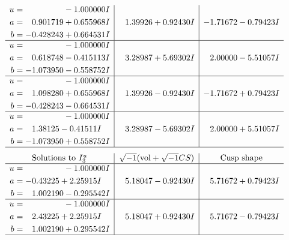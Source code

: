 \documentclass[1p]{elsarticle_modified}
\theoremstyle{definition}
\newcommand{\I}{\sqrt{-1}}
\begin{document}
$$\begin{array}{c|c|c}
\begin{aligned}
u &= \phantom{-0.000000 } -1.000000 I \\
a &= \phantom{-}0.901719 + 0.655968 I \\
b &= -0.428243 + 0.664531 I\end{aligned}
 & \phantom{-}1.39926 + 0.92430 I & -1.71672 - 0.79423 I \\ \hline\begin{aligned}
u &= \phantom{-0.000000 } -1.000000 I \\
a &= \phantom{-}0.618748 - 0.415113 I \\
b &= -1.073950 - 0.558752 I\end{aligned}
 & \phantom{-}3.28987 + 5.69302 I & \phantom{-}2.00000 - 5.51057 I \\ \hline\begin{aligned}
u &= \phantom{-0.000000 } -1.000000 I \\
a &= \phantom{-}1.098280 + 0.655968 I \\
b &= -0.428243 - 0.664531 I\end{aligned}
 & \phantom{-}1.39926 - 0.92430 I & -1.71672 + 0.79423 I \\ \hline\begin{aligned}
u &= \phantom{-0.000000 } -1.000000 I \\
a &= \phantom{-}1.38125 - 0.41511 I \\
b &= -1.073950 + 0.558752 I\end{aligned}
 & \phantom{-}3.28987 - 5.69302 I & \phantom{-}2.00000 + 5.51057 I\\
 \hline 
 \end{array}$$\newpage$$\begin{array}{c|c|c}  
\text{Solutions to }I^u_{3}& \I (\text{vol} + \sqrt{-1}CS) & \text{Cusp shape}\\
 \hline 
\begin{aligned}
u &= \phantom{-0.000000 } -1.000000 I \\
a &= -0.43225 + 2.25915 I \\
b &= \phantom{-}1.002190 - 0.295542 I\end{aligned}
 & \phantom{-}5.18047 - 0.92430 I & \phantom{-}5.71672 + 0.79423 I \\ \hline\begin{aligned}
u &= \phantom{-0.000000 } -1.000000 I \\
a &= \phantom{-}2.43225 + 2.25915 I \\
b &= \phantom{-}1.002190 + 0.295542 I\end{aligned}
 & \phantom{-}5.18047 + 0.92430 I & \phantom{-}5.71672 - 0.79423 I\\
 \hline 
 \end{array}$$\newpage\newpage\renewcommand{\arraystretch}{1}
\end{document}

